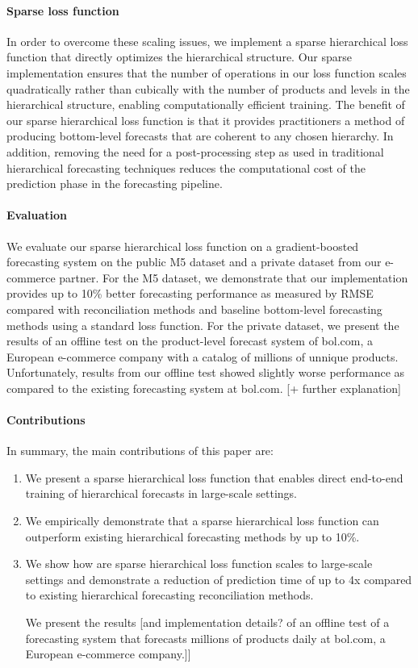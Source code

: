 \documentclass[preprint, 3p, times, twocolumn]{elsarticle}
\begin{document}
\paragraph{Sparse loss function} In order to overcome these scaling issues, we implement a sparse hierarchical loss function that directly optimizes the hierarchical structure. Our sparse implementation ensures that the number of operations in our loss function scales quadratically rather than cubically with the number of products and levels in the hierarchical structure, enabling computationally efficient training. The benefit of our sparse hierarchical loss function is that it provides practitioners a method of producing bottom-level forecasts that are coherent to any chosen hierarchy. In addition, removing the need for a post-processing step as used in traditional hierarchical forecasting techniques reduces the computational cost of the prediction phase in the forecasting pipeline.

\paragraph{Evaluation} We evaluate our sparse hierarchical loss function on a gradient-boosted forecasting system on the public M5 dataset \cite{makridakis_m5_2022} and a private dataset from our e-commerce partner. For the M5 dataset, we demonstrate that our implementation provides up to 10\% better forecasting performance as measured by RMSE compared with reconciliation methods and baseline bottom-level forecasting methods using a standard loss function. For the private dataset, we present the results of an offline test on the product-level forecast system of bol.com, a European e-commerce company with a catalog of millions of unnique products. Unfortunately, results from our offline test showed slightly worse performance as compared to the existing forecasting system at bol.com. [+ further explanation]

\paragraph{Contributions} In summary, the main contributions of this paper are:
\begin{enumerate}
  \item We present a sparse hierarchical loss function that enables direct end-to-end training of hierarchical forecasts in large-scale settings.
  \item We empirically demonstrate that a sparse hierarchical loss function can outperform existing hierarchical forecasting methods by up to 10\%.
  \item We show how are sparse hierarchical loss function scales to large-scale settings and demonstrate a reduction of prediction time of up to 4x compared to existing hierarchical forecasting reconciliation methods.
  \item [We present the results [and implementation details?] of an offline test of a forecasting system that forecasts millions of products daily at bol.com, a European e-commerce company.]]
\end{enumerate}
\end{document}
